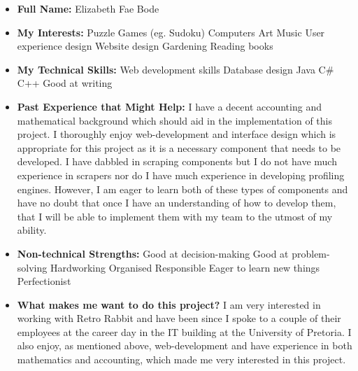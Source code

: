 \documentclass{article}
\begin{document}
	\begin{itemize}
		\item \textbf{Full Name:} Elizabeth Fae Bode
		\item \textbf{My Interests:}
		\subitem Puzzle Games (eg. Sudoku)
		\subitem Computers
		\subitem Art
		\subitem Music
		\subitem User experience design
		\subitem Website design
		\subitem Gardening
		\subitem Reading books
		
		\item \textbf{My Technical Skills:}
		\subitem Web development skills
		\subitem Database design
		\subitem Java
		\subitem C\#
		\subitem C++
		\subitem Good at writing
		
		\item \textbf{Past Experience that Might Help:} \newline
		I have a decent accounting and mathematical background which should aid in the implementation of this project. I thoroughly enjoy web-development and interface design which is appropriate for this project as it is a necessary component that needs to be developed. I have dabbled in scraping components but I do not have much experience in scrapers nor do I have much experience in developing profiling engines. However, I am eager to learn both of these types of components and have no doubt that once I have an understanding of how to develop them, that I will be able to implement them with my team to the utmost of my ability.
		
		\item \textbf{Non-technical Strengths:}
		\subitem Good at decision-making
		\subitem Good at problem-solving
		\subitem Hardworking
		\subitem Organised
		\subitem Responsible
		\subitem Eager to learn new things
		\subitem Perfectionist
		
		\item \textbf{What makes me want to do this project?} \newline
		I am very interested in working with Retro Rabbit and have been since I spoke to a couple of their employees at the career day in the IT building at the University of Pretoria. I also enjoy, as mentioned above, web-development and have experience in both mathematics and accounting, which made me very interested in this project.
	\end{itemize}
\end{document}
